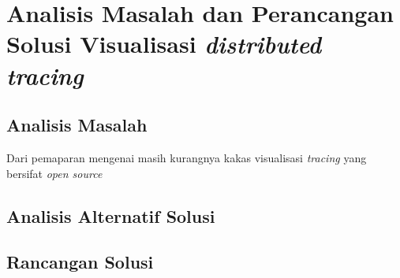 \chapter{Analisis Masalah dan Perancangan Solusi Visualisasi \textit{distributed tracing}}



\section{Analisis Masalah}

Dari pemaparan mengenai masih kurangnya kakas visualisasi \textit{tracing} yang bersifat \textit{open source}



\section{Analisis Alternatif Solusi}

\section{Rancangan Solusi}


